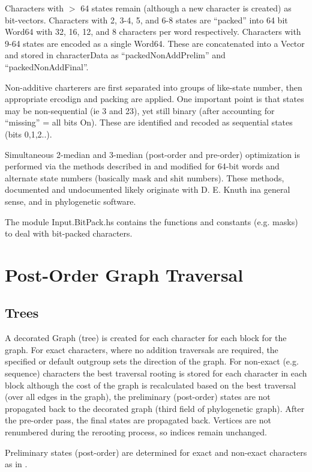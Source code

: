 \documentclass[11pt]{article}
\begin{document}
		Characters with $>$ 64 states remain (although a new character is created) as bit-vectors.  Characters with 
		2, 3-4, 5, and 6-8 states are ``packed'' into 64 bit Word64 with 32, 16, 12, and 8 characters per word respectively. Characters with 9-64 states are encoded as a single Word64. These are concatenated into a Vector and stored in characterData as ``packedNonAddPrelim'' and ``packedNonAddFinal''.
		
		Non-additive charterers are first separated into groups of like-state number, then appropriate ercodign
		and packing are applied.  One important point is that states may be non-sequential (ie 3 and 23), yet
		still binary (after accounting for ``missing'' = all bits On).  These are identified and recoded as sequential states (bits 0,1,2..).
		
		Simultaneous 2-median and 3-median (post-order and pre-order) optimization is performed via the methods described in \cite{WhiteandHolland2011} and \cite{goloboff2002} modified for 64-bit words and alternate state numbers (basically mask and shit numbers).  These methods, documented and undocumented likely originate with D. E. Knuth ina general sense, and \cite{Farris1988} in phylogenetic software.
		
		The module Input.BitPack.hs contains the functions and constants (e.g. masks) to deal 
		with bit-packed characters.
		
	\section{Post-Order Graph Traversal}
		\subsection{Trees}
		A decorated Graph (tree) is created for each character for each block for the graph.  For exact characters, where no addition traversals are required, 
		the specified or default
		outgroup sets the direction of the graph.  For non-exact (e.g. sequence) characters the best traversal rooting is stored for each character in each block
		although the cost of the graph is recalculated based on the best traversal (over all edges in the graph), the preliminary (post-order) states are not propagated back
		to the decorated graph (third field of phylogenetic graph).  After the pre-order pass, the final states are propagated back.
		Vertices are not renumbered during the rerooting process, so indices remain unchanged.
		
			Preliminary states (post-order) are determined for exact and non-exact characters as in \cite{Wheeler2012}.
	
\end{document}
